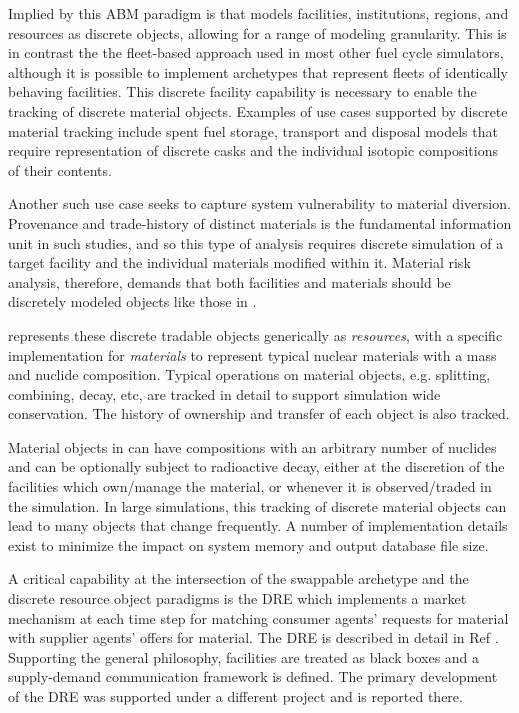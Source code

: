 Implied by this \gls{ABM} paradigm is that \Cyclus models facilities,
institutions, regions, and resources as discrete objects, allowing for a range
of modeling granularity.  This is in contrast the the fleet-based approach
used in most other fuel cycle simulators, although it is possible to implement
\Cyclus archetypes that represent fleets of identically behaving facilities.
This discrete facility capability is necessary to enable the tracking of
discrete material objects.  Examples of use cases supported by discrete
material tracking include spent fuel storage, transport and disposal models
that require representation of discrete casks and the individual isotopic
compositions of their contents.

Another such use case seeks to capture system vulnerability to material
diversion. Provenance and trade-history of distinct materials is the
fundamental information unit in such studies, and so this type of analysis
requires discrete simulation of a target facility and the individual materials
modified within it.  Material risk analysis, therefore, demands that both
facilities and materials should be discretely modeled objects like those in
\Cyclus.

\Cyclus represents these discrete tradable objects generically as
\textit{resources}, with a specific implementation for \textit{materials} to
represent typical nuclear materials with a mass and nuclide composition.
Typical operations on material objects, e.g. splitting, combining, decay, etc,
are tracked in detail to support simulation wide conservation.  The history of
ownership and transfer of each object is also tracked.

Material objects in \Cyclus can have compositions with an arbitrary number of
nuclides and can be optionally subject to radioactive decay, either at the
discretion of the facilities which own/manage the material, or whenever it is
observed/traded in the simulation.  In large simulations, this tracking of
discrete material objects can lead to many objects that change frequently.  A
number of implementation details exist to minimize the impact on system memory
and output database file size.

A critical capability at the intersection of the swappable archetype and the
discrete resource object paradigms is the \gls{DRE} which implements a market
mechanism at each time step for matching consumer agents' requests for
material with supplier agents' offers for material.  The \gls{DRE} is
described in detail in Ref \cite{gidden_agent-based_2015}.  Supporting the
general \Cyclus philosophy, facilities are treated as black boxes and a
supply-demand communication framework is defined.  The primary development of
the \gls{DRE} was supported under a different project and is reported
there\cite{cyclus-opt-report}.

